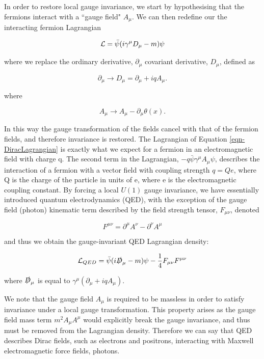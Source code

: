 In order to restore local gauge invariance, we start by hypothesising that the fermions interact with a ``gauge field" $A_{\mu}$. We can then redefine our the interacting fermion Lagrangian 

\begin{equation} \label{eqn-DiracLagrangian}
\mathcal{L} = \bar{\psi}(i \gamma^{\mu}D_{\mu}-m)\psi
\end{equation}

where we replace the ordinary derivative, $\partial_{\mu}$ covariant derivative, $D_{\mu}$, defined as

\begin{equation}
\partial_{\mu} \to D_{\mu} = \partial_{\mu} + iqA_{\mu}.
\end{equation}

where

\begin{equation}
A_{\mu} \to A_{\mu} - \partial_{\mu} \theta (x).
\end{equation}

In this way the gauge transformation of the fields cancel with that of the fermion fields, and therefore invariance is restored. The Lagrangian of Equation \ref{eqn-DiracLagrangian} is exactly what we expect for a fermion in an electromagnetic field with charge q. The second term in the Lagrangian, $-q\bar{\psi}\gamma^{\mu}A_{\mu}\psi$, describes the interaction of a fermion with a vector field with coupling strength $q=Qe$, where Q is the charge of the particle in units of e, where e is the electromagnetic coupling constant. By forcing a local $U(1)$ gauge invariance, we have essentially introduced quantum electrodynamics (QED), with the exception of the gauge field (photon) kinematic term described by the field strength tensor, $F_{\mu \nu}$, denoted  

\begin{equation}
F^{\mu \nu} = \partial^{\mu}A^{\nu} - \partial^{\nu}A^{\mu}
\end{equation}

and thus we obtain the gauge-invariant QED Lagrangian density:

\begin{equation}
\mathcal{L}_{QED} = \bar{\psi}(i \slashed{D}_{\mu} - m) \psi - \frac{1}{4}F_{\mu \nu}F^{\mu \nu}
\end{equation}

where $\slashed{D}_{\mu}$ is equal to $\gamma^{\mu}(\partial_{\mu} + iqA_{\mu})$.

We note that the gauge field $A_{\mu}$ is required to be massless in order to satisfy invariance under a local gauge transformation. This property arises as the gauge field mass term $m^2A_{\mu}A^{\mu}$ would explicitly break the gauge invariance, and thus must be removed from the Lagrangian density. Therefore we can say that QED describes Dirac fields, such as electrons and positrons, interacting with Maxwell electromagnetic force fields, photons.

